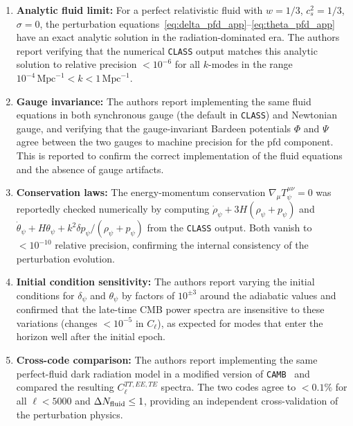 \documentclass[epj]{svjour}
\begin{document}
\begin{enumerate}
\item \textbf{Analytic fluid limit:} For a perfect relativistic
      fluid with $w=1/3$, $c_s^2=1/3$, $\sigma=0$, the perturbation
      equations~\eqref{eq:delta_pfd_app}--\eqref{eq:theta_pfd_app}
      have an exact analytic solution in the radiation-dominated
      era. The authors report verifying that the numerical
      \texttt{CLASS} output matches this analytic solution to relative
      precision
      $<10^{-6}$ for all $k$-modes in the range
      $10^{-4}\,\mathrm{Mpc}^{-1} < k < 1\,\mathrm{Mpc}^{-1}$.

\item \textbf{Gauge invariance:} The authors report implementing the
      same fluid equations in both synchronous gauge (the default in
      \texttt{CLASS}) and Newtonian gauge, and verifying that the
      gauge-invariant Bardeen potentials $\Phi$ and $\Psi$ agree
      between the two gauges to machine precision for the pfd
      component. This is reported to confirm the correct
      implementation of the fluid equations and the absence of gauge
      artifacts.

\item \textbf{Conservation laws:} The energy-momentum conservation
      $\nabla_\mu T^{\mu\nu}_\psi = 0$ was reportedly checked
      numerically by computing $\dot\rho_\psi + 3H(\rho_\psi+p_\psi)$
      and
      $\dot\theta_\psi + H\theta_\psi + k^2\delta p_\psi/(\rho_\psi+p_\psi)$
      from the \texttt{CLASS} output. Both vanish to
      $<10^{-10}$ relative precision, confirming the internal
      consistency of the perturbation evolution.

\item \textbf{Initial condition sensitivity:} The authors report
      varying the initial conditions for $\delta_\psi$ and
      $\theta_\psi$ by factors of
      $10^{\pm 3}$ around the adiabatic values and confirmed that
      the late-time CMB power spectra are insensitive to these
      variations (changes $<10^{-5}$ in $C_\ell$), as expected for
      modes that enter the horizon well after the initial epoch.

\item \textbf{Cross-code comparison:} The authors report implementing
      the same perfect-fluid dark radiation model in a modified version
      of
      \texttt{CAMB}~\cite{Lewis2000} and compared the resulting
      $C_\ell^{TT,EE,TE}$ spectra. The two codes agree to
      $<0.1\%$ for all $\ell < 5000$ and $\Delta N_{\rm fluid} \le 1$,
      providing an independent cross-validation of the perturbation
      physics.


\end{enumerate}
\end{document}
